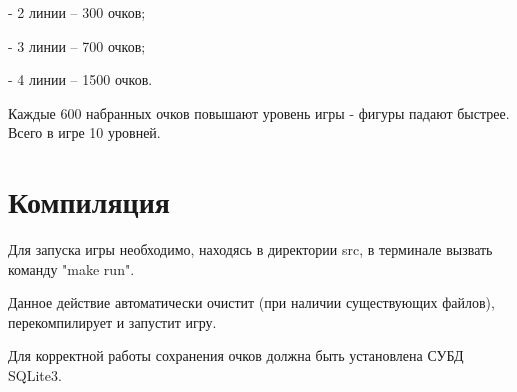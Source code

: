 \documentclass{article}
\begin{document}
- 2 линии -- 300 очков;

- 3 линии -- 700 очков;

- 4 линии -- 1500 очков.


Каждые 600 набранных очков повышают уровень игры - фигуры падают быстрее. Всего в игре 10 уровней.


\section*{Компиляция}
Для запуска игры необходимо, находясь в директории src, в терминале вызвать команду "make run".


Данное действие автоматически очистит (при наличии существующих файлов), перекомпилирует и запустит игру.


Для корректной работы сохранения очков должна быть установлена СУБД SQLite3.
\end{document}
